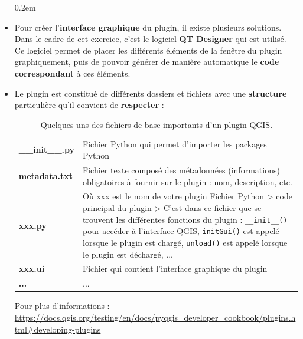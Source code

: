 \documentclass[11pt]{article}
\begin{document}
\begin{itemize}\itemsep0.2em
\renewcommand\labelitemi{\---}
\item Pour créer l'\textbf{interface graphique} du plugin, il existe plusieurs solutions. Dans le cadre de cet exercice, c'est le logiciel \textbf{QT Designer} qui est utilisé. Ce logiciel permet de placer les différents éléments de la fenêtre du plugin graphiquement, puis de pouvoir générer de manière automatique le \textbf{code correspondant} à ces éléments. 
\item Le plugin est constitué de différents dossiers et fichiers avec une \textbf{structure} particulière qu'il convient de \textbf{respecter} :

\vspace*{-0em}
\begin{minipage}[t]{0.8\textwidth}
\begin{table}[H]
\begin{tabular}{@{}| L{2.0cm} | L{12.36cm} | @{}}
\hline 
\textbf{\_\_init\_\_.py} & {Fichier Python qui permet d'importer les packages Python} \\
\textbf{metadata.txt} & {Fichier texte composé des métadonnées (informations) obligatoires à fournir sur le plugin : nom, description, etc.} \\
\textbf{xxx.py} & {Où xxx est le nom de votre plugin
Fichier Python > code principal du plugin > C'est dans ce fichier que se trouvent les différentes fonctions du plugin : \texttt{\_\_init\_\_()} pour accéder à l'interface QGIS, \texttt{initGui()} est appelé lorsque le plugin est chargé, \texttt{unload()} est appelé lorsque le plugin est déchargé, ...} \\
\textbf{xxx.ui} & {Fichier qui contient l'interface graphique du plugin} \\
\textbf{...} & {...} \\
\hline
\end{tabular}
\caption{Quelques-uns des fichiers de base importants d'un plugin QGIS.}
\label{table1}
\end{table}
\end{minipage}
\vspace*{2em}

Pour plus d'informations : \url{https://docs.qgis.org/testing/en/docs/pyqgis_developer_cookbook/plugins.html#developing-plugins}


\end{itemize}
\vspace*{2em}
\end{document}
